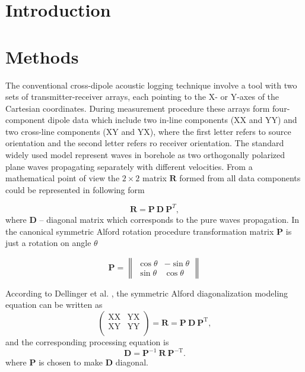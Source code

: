 \documentclass[a4paper,11pt]{article}
\begin{document}
\section{Introduction}

\section{Methods}
The conventional cross-dipole acoustic logging technique involve a tool with two sets of transmitter-receiver arrays, each pointing to the X- or Y-axes of the Cartesian coordinates. During measurement procedure these arrays form four-component dipole data which include two in-line components (XX and YY) and two cross-line components (XY and YX), where the first letter refers to source orientation and the second letter refers ro receiver orientation. The standard widely used model represent waves in borehole as two orthogonally polarized plane waves propagating separately with different velocities. From a mathematical point of view the $2\times2$ matrix $\mathbf{R}$ formed from all data components could be represented in following form

\begin{equation}
\mathbf{R} = \mathbf{P} \ \mathbf{D} \ \mathbf{P}^T, \label{eq:alford_symmetric} 
\end{equation}
where $\mathbf{D}$ -- diagonal matrix which corresponds to the pure waves propagation. In the canonical symmetric Alford rotation \cite{Alford1986} procedure transformation matrix $\mathbf{P}$ is just a rotation on angle $\theta$

\begin{equation*}
\mathbf{P} = \left\|
\begin{array}{cc}
\cos \theta &-\sin \theta \\ 
\sin \theta & \cos \theta
\end{array} 
\right\| 
\end{equation*}

According to Dellinger et al. \cite{Dellinger1998}, the symmetric Alford diagonalization modeling equation can be written as
$$
\left(
\begin{array}{cc}
\mathrm{XX} & \mathrm{YX} \\
\mathrm{XY} & \mathrm{YY} \\
\end{array}
\right) = \mathbf{R} = \mathbf{P} \ \mathbf{D} \ \mathbf{P}^{\mathrm{T}},
$$
and  the corresponding processing equation is
$$
	\mathbf{D} = \mathbf{P}^{-1} \ \mathbf{R} \ \mathbf{P}^{-\mathrm{T}}.
$$
where $ \mathbf{P}$ is chosen to make $ \mathbf{D}$ diagonal.
\\
\end{document}
